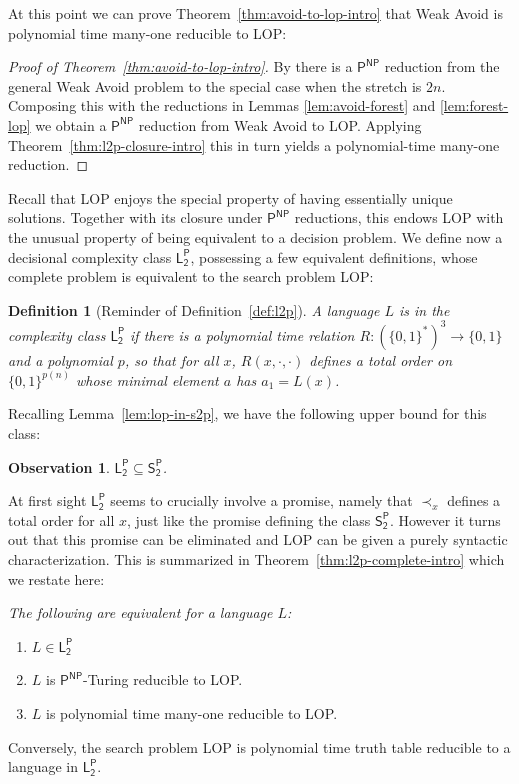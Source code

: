 \documentclass[11pt]{article}
\newtheorem*{theorem*}{Theorem}
\newtheorem*{definition*}{Definition}
\newtheorem{observation}{Observation}
\newcommand{\todo}[1]{\textcolor{red}{TODO: #1}}
\newcommand{\B}{\{0,1\}}
\begin{document}
At this point we can prove Theorem~\ref{thm:avoid-to-lop-intro} that Weak Avoid is polynomial time many-one reducible to LOP:
\begin{proof}[Proof of Theorem~\ref{thm:avoid-to-lop-intro}]
By \cite{Korten} there is a $\mathsf{P^{NP}}$ reduction from the general Weak Avoid problem to the special case when the stretch is $2n$. Composing this with the reductions in Lemmas \ref{lem:avoid-forest} and \ref{lem:forest-lop} we obtain a $\mathsf{P^{NP}}$ reduction from Weak Avoid to LOP. Applying Theorem~\ref{thm:l2p-closure-intro} this in turn yields a polynomial-time many-one reduction.
\end{proof}

Recall that LOP enjoys the special property of having essentially unique solutions. Together with its closure under $\mathsf{P^{NP}}$ reductions, this endows LOP with the unusual property of being equivalent to a decision problem. We define now a decisional complexity class $\mathsf{L_2^P}$, possessing a few equivalent definitions, whose complete problem is equivalent to the search problem LOP: 
\begin{definition*}[Reminder of Definition~\ref{def:l2p}]
A language $L$ is in the complexity class $\mathsf{L_2^P}$ if there is a polynomial time relation $R: (\B^*)^3 \to \B$ and a polynomial $p$, so that for all $x$, $R(x, \cdot, \cdot)$ defines a total order on $\B^{p(n)}$ whose minimal element $a$ has $a_1 = L(x)$. 
\end{definition*}
Recalling Lemma~\ref{lem:lop-in-s2p}, we have the following upper bound for this class:
\begin{observation}
$\mathsf{L_2^P} \subseteq \mathsf{S_2^P}$.
\end{observation}
At first sight $\mathsf{L_2^P}$ seems to crucially involve a promise, namely that $\prec_x$ defines a total order for all $x$, just like the promise defining the class $\mathsf{S_2^P}$. However it turns out that this promise can be eliminated and $\mathrm{LOP}$ can be given a purely syntactic characterization. This is summarized in Theorem~\ref{thm:l2p-complete-intro} which we restate here:

\medskip

{\it The following are equivalent for a language $L$:
\begin{enumerate}
    \item $L \in \mathsf{L_2^P}$
    \item $L$ is $\mathsf{P^{NP}}
$-Turing reducible to LOP.
    \item $L$ is polynomial time many-one reducible to LOP.
\end{enumerate}
Conversely, the search problem LOP is polynomial time truth table reducible to a language in $\mathsf{L_2^P}$.}
\end{document}
